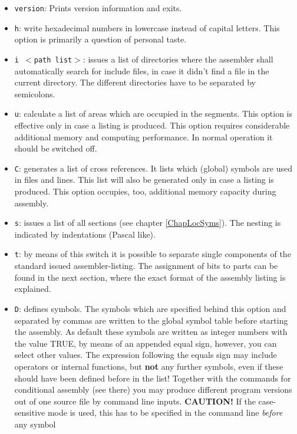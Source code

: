 \documentclass[12pt,twoside]{report}
\newcommand{\bb}[1]{{\bf #1}}
\newcommand{\tty}[1]{{\tt #1}}
\begin{document}
\begin{itemize}
{      info.}
\item{\tty{version}: Prints version information and exits.}
\item{\tty{h}: write hexadecimal numbers in lowercase instead of capital
      letters. This option is primarily a question of personal
      taste.}
\item{\tty{i $<$path list$>$}: issues a list of directories where the
      assembler shall automatically search for include
      files, in case it didn't find a file in the
      current directory.  The different directories
      have to be separated by semicolons.}
\item{\tty{u}: calculate a list of areas which are occupied in the segments.
      This option is effective only in case a listing is
      produced. This option requires considerable additional
      memory and computing performance. In normal operation it
      should be switched off.}
\item{\tty{C}: generates a list of cross references.  It lists which (global)
      symbols are used in files and lines.  This list will also be
      generated only in case a listing is produced.  This option
      occupies, too, additional memory capacity during assembly.}
\item{\tty{s}: issues a list of all sections (see chapter
      \ref{ChapLocSyms}).  The nesting is indicated  by indentations
      (Pascal like).}
\item{\tty{t}: by means of this switch it is possible to separate single
      components of the standard issued assembler-listing.  The assignment
      of bits to parts can be found in the next section, where the exact
      format of the assembly listing is explained.}
\item{\tty{D}: defines symbols.  The symbols which are specified behind this
      option and separated by commas are written to the
      global symbol table before starting the assembly.  As default
      these symbols are written as integer numbers with the
      value TRUE, by means of an appended equal sign, however, you
      can select other values.  The expression following the equals
      sign may include operators or internal functions, but \bb{not}
      any further symbols, even if these should have been defined
      before in the list!  Together with the commands for
      conditional assembly (see there) you may produce different
      program versions out of one source file by command line
      inputs. {\bf CAUTION!} If the case-sensitive mode is used, this has
      to be specified in the command line {\em before} any symbol
}
\end{itemize}
\end{document}
